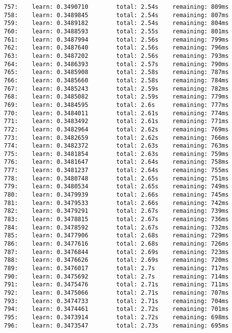 \documentclass[11pt]{article}
\begin{document}
\begin{Verbatim}[commandchars=\\\{\}]
757:    learn: 0.3490710        total: 2.54s    remaining: 809ms
758:    learn: 0.3489845        total: 2.54s    remaining: 807ms
759:    learn: 0.3489182        total: 2.54s    remaining: 804ms
760:    learn: 0.3488593        total: 2.55s    remaining: 801ms
761:    learn: 0.3487994        total: 2.56s    remaining: 799ms
762:    learn: 0.3487640        total: 2.56s    remaining: 796ms
763:    learn: 0.3487202        total: 2.56s    remaining: 793ms
764:    learn: 0.3486393        total: 2.57s    remaining: 790ms
765:    learn: 0.3485908        total: 2.58s    remaining: 787ms
766:    learn: 0.3485660        total: 2.58s    remaining: 784ms
767:    learn: 0.3485243        total: 2.59s    remaining: 782ms
768:    learn: 0.3485082        total: 2.59s    remaining: 779ms
769:    learn: 0.3484595        total: 2.6s     remaining: 777ms
770:    learn: 0.3484011        total: 2.61s    remaining: 774ms
771:    learn: 0.3483492        total: 2.61s    remaining: 771ms
772:    learn: 0.3482964        total: 2.62s    remaining: 769ms
773:    learn: 0.3482659        total: 2.62s    remaining: 766ms
774:    learn: 0.3482372        total: 2.63s    remaining: 763ms
775:    learn: 0.3481854        total: 2.63s    remaining: 759ms
776:    learn: 0.3481647        total: 2.64s    remaining: 758ms
777:    learn: 0.3481237        total: 2.64s    remaining: 755ms
778:    learn: 0.3480748        total: 2.65s    remaining: 751ms
779:    learn: 0.3480534        total: 2.65s    remaining: 749ms
780:    learn: 0.3479939        total: 2.66s    remaining: 745ms
781:    learn: 0.3479533        total: 2.66s    remaining: 742ms
782:    learn: 0.3479291        total: 2.67s    remaining: 739ms
783:    learn: 0.3478815        total: 2.67s    remaining: 736ms
784:    learn: 0.3478592        total: 2.67s    remaining: 732ms
785:    learn: 0.3477906        total: 2.68s    remaining: 729ms
786:    learn: 0.3477616        total: 2.68s    remaining: 726ms
787:    learn: 0.3476844        total: 2.69s    remaining: 723ms
788:    learn: 0.3476626        total: 2.69s    remaining: 720ms
789:    learn: 0.3476017        total: 2.7s     remaining: 717ms
790:    learn: 0.3475692        total: 2.7s     remaining: 714ms
791:    learn: 0.3475476        total: 2.71s    remaining: 711ms
792:    learn: 0.3475066        total: 2.71s    remaining: 707ms
793:    learn: 0.3474733        total: 2.71s    remaining: 704ms
794:    learn: 0.3474461        total: 2.72s    remaining: 701ms
795:    learn: 0.3473914        total: 2.72s    remaining: 698ms
796:    learn: 0.3473547        total: 2.73s    remaining: 695ms

\end{Verbatim}
\end{document}
